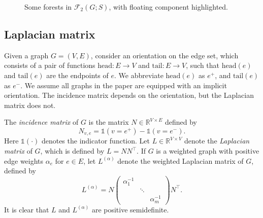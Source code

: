 \documentclass{amsart}
\theoremstyle{definition}
\newcommand{\RR}{\mathbb{R}}
\newcommand{\one}{\mathds{1}}
\newcommand{\La}{L^{(\alpha)}}
\newcommand{\tr}{\intercal}
\newcommand{\forests}{\mathcal{F}}
\begin{document}
\begin{figure}[h]
%	
%
%
\caption{Some forests in $\forests_2(G;S)$, with floating component highlighted.}
\label{fig:2-forests}
\end{figure}


\subsection{Laplacian matrix}

Given a graph $G = (V,E)$, consider an orientation on the edge set, which consists of a pair of functions $\mathrm{head}: E \to V$ and $\mathrm{tail}: E \to V$, such that $\mathrm{head}(e)$ and $\mathrm{tail}(e)$ are the endpoints of $e$.
We abbreviate $\mathrm{head}(e)$ as $e^+$, and $\mathrm{tail}(e)$ as $e^-$.
We assume all graphs in the paper are equipped with an implicit orientation.
The incidence matrix depends on the orientation, but the Laplacian matrix does not.

The {\em incidence matrix} of $G$ is the matrix $N \in \RR^{V \times E}$ defined by
\[
	N_{v, e} = \one(v = e^+) - \one(v = e^-).
\]
Here $\one(\cdot)$ denotes the indicator function.
Let $L \in \RR^{V \times V}$ denote the {\em Laplacian matrix} of $G$, which is defined by
$
	L = N N^\tr.
$
If $G$ is a weighted graph with positive edge weights $\alpha_e$ for $e \in E$,
let $\La$ denote the weighted Laplacian matrix of $G$,
defined by
\begin{equation}
\label{eq:weighted-laplacian}
	\La = N \begin{pmatrix}
	\alpha_1^{-1} & & \\
	& \ddots & \\
	& & \alpha_m^{-1}
	\end{pmatrix} N^\tr .
\end{equation}
It is clear that $L$ and $\La$ are positive semidefinite.
\end{document}
